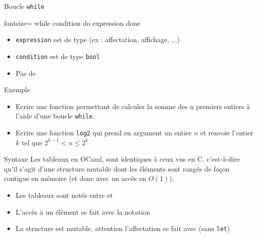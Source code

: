 \documentclass[10pt]{beamer}
\begin{document}
\begin{frame}[fragile]{\Ctitle}{\stitle}
	\begin{block}{Boucle  {\tt while}}
    \begin{OCaml*}{fontsize=\small}
while condition do
    expression
done
    \end{OCaml*}
    \begin{itemize}
        \item<4-> {\tt expression} est de type  (ex : affectation, affichage, ...)
        \item<5-> {\tt condition} est de type {\tt bool}
        \item<6-> Pas de 
    \end{itemize} 
    \end{block}
\end{frame}

\begin{frame}{\Ctitle}{\stitle}
    \begin{exampleblock}{Exemple}
        \begin{itemize}
            \item<1-> Ecrire une fonction permettant de calculer la somme des n premiers entiers à l'aide d'une boucle {\tt while}. 
            \item<2-> Ecrire une fonction {\tt log2} qui prend en argument un entier $n$ et renvoie l'entier $k$ tel que $2^{k-1}< n \leq 2^k$
        \end{itemize}
    \end{exampleblock}
\end{frame}


\begin{frame}[fragile]{\Ctitle}{\stitle}
    \begin{block}{Syntaxe}
    Les tableaux en OCaml, sont identiques à ceux vus en C. c'est-à-dire qu'il s'agit d'une structure mutable dont les éléments sont rangés de façon contigue en mémoire (et donc avec un accès en $O(1)$).
    \begin{itemize}
        \item<1-> Les tableaux sont notés entre \kw{[|} et \kw{|]}\\
        \item<3-> L'accès à un élément se fait avec la notation \\
        \item<5-> La structure est mutable, attention l'affectation se fait avec \kw{<-} (sans {\tt let})\\
    \end{itemize}
\end{block}
\end{frame}
\end{document}
